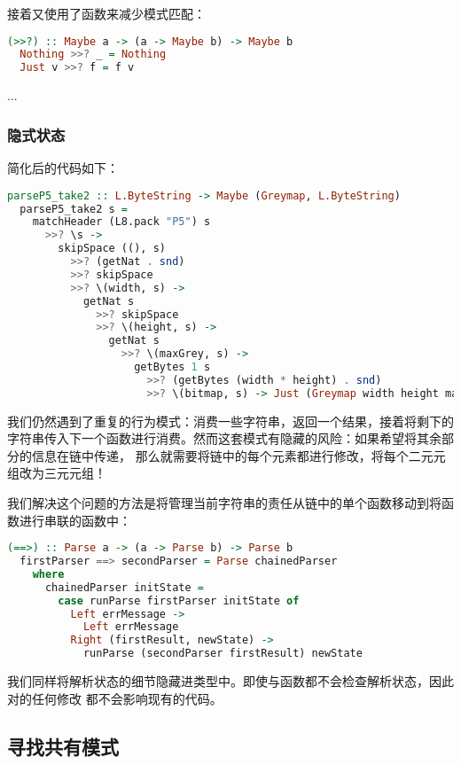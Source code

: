 \documentclass[./main.tex]{subfiles}
\begin{document}
接着又使用了函数来减少模式匹配：

\begin{lstlisting}[language=Haskell]
  (>>?) :: Maybe a -> (a -> Maybe b) -> Maybe b
  Nothing >>? _ = Nothing
  Just v >>? f = f v
\end{lstlisting}

...

\subsubsection*{隐式状态}

简化后的代码如下：

\begin{lstlisting}[language=Haskell]
  parseP5_take2 :: L.ByteString -> Maybe (Greymap, L.ByteString)
  parseP5_take2 s =
    matchHeader (L8.pack "P5") s
      >>? \s ->
        skipSpace ((), s)
          >>? (getNat . snd)
          >>? skipSpace
          >>? \(width, s) ->
            getNat s
              >>? skipSpace
              >>? \(height, s) ->
                getNat s
                  >>? \(maxGrey, s) ->
                    getBytes 1 s
                      >>? (getBytes (width * height) . snd)
                      >>? \(bitmap, s) -> Just (Greymap width height maxGrey bitmap, s)
\end{lstlisting}

我们仍然遇到了重复的行为模式：消费一些字符串，返回一个结果，接着将剩下的字符串传入下一个函数进行消费。然而这套模式有隐藏的风险：如果希望将其余部分的信息在链中传递，
那么就需要将链中的每个元素都进行修改，将每个二元元组改为三元元组！

我们解决这个问题的方法是将管理当前字符串的责任从链中的单个函数移动到将函数进行串联的函数中：

\begin{lstlisting}[language=Haskell]
  (==>) :: Parse a -> (a -> Parse b) -> Parse b
  firstParser ==> secondParser = Parse chainedParser
    where
      chainedParser initState =
        case runParse firstParser initState of
          Left errMessage ->
            Left errMessage
          Right (firstResult, newState) ->
            runParse (secondParser firstResult) newState
\end{lstlisting}

我们同样将解析状态的细节隐藏进类型中。即使与函数都不会检查解析状态，因此对的任何修改
都不会影响现有的代码。

\subsection*{寻找共有模式}
\end{document}
